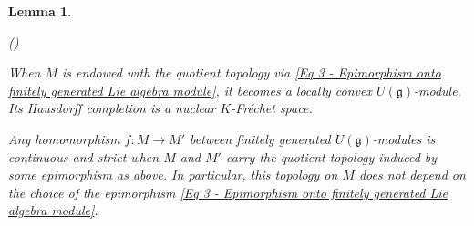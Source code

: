 \documentclass[a4paper, reqno, 10pt]{amsart}
\newtheorem{lemma}[theorem]{Lemma}
\theoremstyle{definition}
\newenvironment{altenumerate}
	{\begin{list}
		{\textup{(\theenumi)} }
		{\usecounter{enumi}
			\setlength{\labelwidth}{0pt}
			\setlength{\labelsep}{0pt}
			\setlength{\leftmargin}{0pt}
			\setlength{\itemsep}{0pt}
			\setlength{\topsep}{0pt}
		\renewcommand{\theenumi}{\roman{enumi}}
		}}
	{\end{list}}
\numberwithin{equation}{section}
\newcommand{\ra}{\rightarrow}
\newcommand{\Fg}{{\mathfrak {g}}}
\begin{document}
\begin{lemma}\label{Lemma 3 - Topologies on Lie algebra modules}
	\begin{altenumerate}
		\item
		When $M$ is endowed with the quotient topology via \eqref{Eq 3 - Epimorphism onto finitely generated Lie algebra module}, it becomes a locally convex $U(\Fg)$-module.
		Its Hausdorff completion is a nuclear $K$-Fr\'echet space.
		
		\item
		Any homomorphism $f \colon M \ra M'$ between finitely generated $U(\Fg)$-modules is continuous and strict when $M$ and $M'$ carry the quotient topology induced by some epimorphism as above.
		In particular, this topology on $M$ does not depend on the choice of the epimorphism \eqref{Eq 3 - Epimorphism onto finitely generated Lie algebra module}.
	\end{altenumerate}
\end{lemma}
\end{document}
